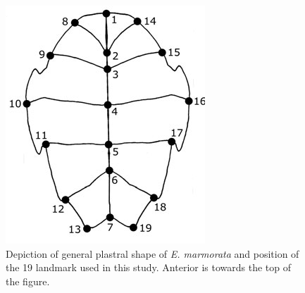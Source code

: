 \documentclass[12pt,letterpaper]{article}
\begin{document}
\clearpage



\clearpage

\begin{figure}[ht]
  \centering
  \includegraphics[height = \textheight, width = \textwidth, keepaspectratio = true]{figure/plastra}
  \caption{Depiction of general plastral shape of \textit{E. marmorata} and position of the 19 landmark used in this study. Anterior is towards the top of the figure.}
  \label{fig:plastra}
\end{figure}
\end{document}
